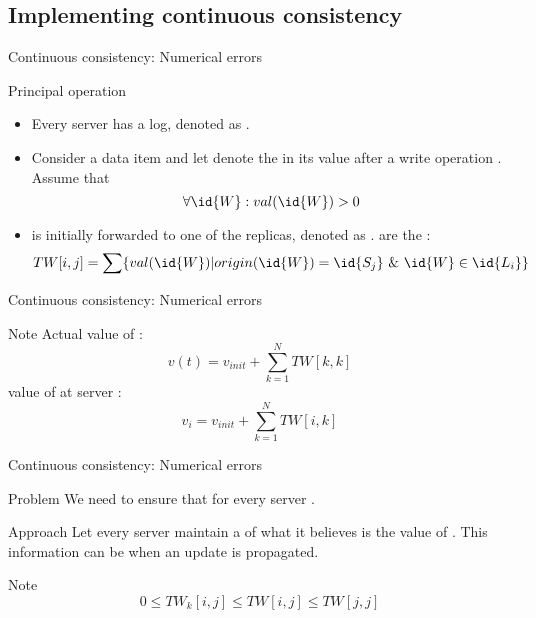 \subsection{Implementing continuous consistency}
\begin{slide}{Continuous consistency: Numerical errors}
  \begin{block}{Principal operation}
    \begin{itemize}
    \item Every server  has a log, denoted as .
    \item Consider a data item  and let  denote the  in its value
      after a write operation . Assume that \[\forall \id{W}: val(\id{W}) > 0\]
    \item {} is initially forwarded to one of the  replicas, denoted as .  are
      the :
      \[TW[i,j] = \sum \{ val(\id{W}) | origin(\id{W}) = \id{S_j} \mbox{\ \&\ } \id{W} \in \id{L_i} \}\]
    \end{itemize}
  \end{block}
\end{slide}
\begin{slide}{Continuous consistency: Numerical errors}
  \begin{alertblock}{Note}
    Actual value  of :
    \[v(t) = v_{init} + \sum_{k=1}^N TW[k,k]\]
    value  of  at server :\vspace*{-0.25cm}
    \[v_i = v_{init} + \sum_{k=1}^N TW[i,k]\]
  \end{alertblock}
\end{slide}
\begin{slide}{Continuous consistency: Numerical errors}
  \begin{alertblock}{Problem}
    We need to ensure that  for every server .
  \end{alertblock}
  \begin{block}{Approach}
    Let every server  maintain a   of what it believes is the value of
    . This information can be  when an update is propagated.
  \end{block}
  \begin{alertblock}{Note}
    \[0 \leq TW_k[i,j] \leq TW[i,j] \leq TW[j,j]\]
  \end{alertblock}
\end{slide}
